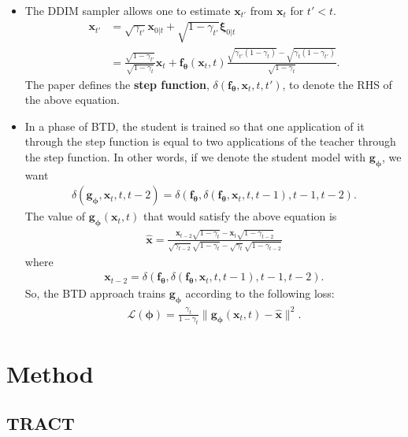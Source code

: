 \documentclass[10pt]{article}
\newcommand{\ve}[1]{\mathbf{#1}}
\newcommand{\ves}[1]{\boldsymbol{#1}}
\newcommand{\mcal}[1]{\mathcal{#1}}
\begin{document}
\begin{itemize}
  \item The DDIM sampler \cite{Song:DDIM:2020} allows one to estimate $\ve{x}_{t'}$ from $\ve{x}_t$ for $t' < t$.
  \begin{align*}
    \ve{x}_{t'} 
    &= \sqrt{\gamma_{t'}} \ve{x}_{0|t} + \sqrt{1 - \gamma_{t'}} \ves{\xi}_{0|t} \\
    &= \frac{\sqrt{1 - \gamma_{t'}}}{\sqrt{1 - \gamma_t}} \ve{x}_t + \ve{f}_{\ves{\theta}}(\ve{x}_t, t) \frac{\sqrt{\gamma_{t'}(1-\gamma_t)} - \sqrt{\gamma_t(1 - \gamma_{t'})}}{\sqrt{1 - \gamma_t}}.
  \end{align*}
  The paper defines the {\bf step function}, $\delta(\ve{f}_{\ves{\theta}}, \ve{x}_t, t, t')$, to denote the RHS of the above equation.

  \item In a phase of BTD, the student is trained so that one application of it through the step function is equal to two applications of the teacher through the step function. In other words, if we denote the student model with $\ve{g}_{\ves{\phi}}$, we want
  \begin{align*}
    \delta(\ve{g}_{\ves{\phi}}, \ve{x}_t, t, t-2)
    = \delta(\ve{f}_{\ves{\theta}}, \delta(\ve{f}_{\ves{\theta}}, \ve{x}_t, t, t-1), t-1, t-2).
  \end{align*}
  The value of $\ve{g}_{\ves{\phi}}(\ve{x}_t, t)$ that would satisfy the above equation is
  \begin{align*}
    \hat{\ve{x}} = \frac{\ve{x}_{t-2} \sqrt{1 - \gamma_t} - \ve{x}_t \sqrt{1 - \gamma_{t-2}}}{\sqrt{\gamma_{t-2}}\sqrt{1 - \gamma_t} - \sqrt{\gamma_t} \sqrt{1 - \gamma_{t-2}} }
  \end{align*}
  where
  \begin{align*}
    \ve{x}_{t-2} = \delta(\ve{f}_{\ves{\theta}}, \delta(\ve{f}_{\ves{\theta}}, \ve{x}_t, t, t-1), t-1, t-2).
  \end{align*}
  So, the BTD approach trains $\ve{g}_{\ves{\phi}}$ according to the following loss:
  \begin{align*}
    \mcal{L}(\ves{\phi}) = \frac{\gamma_t}{1 - \gamma_t} \| \ve{g}_{\ves{\phi}}(\ve{x}_t, t) - \hat{\ve{x}} \|^2.
  \end{align*}
\end{itemize}

\section{Method}

\subsection{TRACT}
\end{document}
